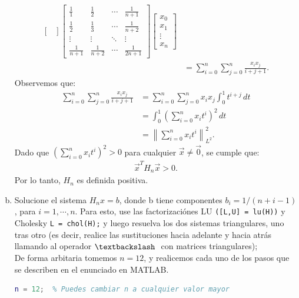 \begin{homeworkProblem}
\begin{solucion}
\begin{enumerate}[a)]
\begin{align*}
\begin{bmatrix}
            \end{bmatrix}
            \begin{bmatrix}
              \frac{1}{1} & \frac{1}{2} & \cdots & \frac{1}{n+1} \\
              \frac{1}{2} & \frac{1}{3} & \cdots & \frac{1}{n+2} \\
              \vdots & \vdots & \ddots & \vdots \\
              \frac{1}{n+1} & \frac{1}{n+2} & \cdots & \frac{1}{2n+1}
            \end{bmatrix}
            \begin{bmatrix}
              x_0 \\ 
              x_1 \\ 
              \vdots \\ 
              x_n
            \end{bmatrix} \\
            & = \sum_{i=0}^n \sum_{j=0}^n \frac{x_i x_j}{i+j+1}.
          \end{align*}
          Observemos que:
          \begin{align*}
            \sum_{i=0}^n \sum_{j=0}^n \frac{x_i x_j}{i+j+1} &= \sum_{i=0}^n \sum_{j=0}^n x_i x_j \int_0^1 t^{i+j} \, dt \\
            &= \int_0^1 \left( \sum_{i=0}^n x_i t^i \right)^2 \, dt \\
            &= \left\| \sum_{i=0}^n x_i t^i \right\|_{L^2}^2.
          \end{align*}
          Dado que \( \left( \sum_{i=0}^n x_i t^i \right)^2 > 0 \) para cualquier \( \vec{x} \neq \vec{0} \), se cumple que:
          \begin{align*}
            \vec{x}^T H_n \vec{x} > 0.
          \end{align*}
          Por lo tanto, \( H_n \) es definida positiva.
        \item Solucione el sistema $H_nx=b$, donde b tiene componentes $b_i=1/(n+i-1)$, para $i=1, \cdots,n.$ Para esto, use las factorizaciónes LU \texttt{([L,U] = lu(H))} y Cholesky \texttt{L = chol(H);} y luego resuelva los dos sistemas triangulares, uno tras otro (es decir, realice las sustituciones hacia adelante y hacia atrás llamando al operador $\textbackslash\ $ con matrices triangulares);\\
          De forma arbitaria tomemos $n=12$, y realicemos cada uno de los pasos que se describen en el enunciado en MATLAB.
          \begin{lstlisting}[language=Matlab]
% Parametro de tamano
n = 12;  % Puedes cambiar n a cualquier valor mayor
            

\end{lstlisting}
\end{enumerate}
\end{solucion}
\end{homeworkProblem}
